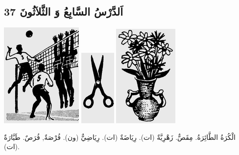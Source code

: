 \documentclass[a5paper]{article}
\begin{document}
\subsection[اَلدَّرْسُ السَّابِعُ وَ الثَّلاَثُونَ 37]{اَلدَّرْسُ السَّابِعُ وَ الثَّلاَثُونَ 37}
 \includegraphics[width=1.5937in,height=2.0417in]{MuhammadBagauddinlatinized-img087.png}   \includegraphics[width=0.698in,height=1.5in]{MuhammadBagauddinlatinized-img088.png}   \includegraphics[width=1.2602in,height=2.0102in]{MuhammadBagauddinlatinized-img089.png} 

الْكُرَةُ الطَّائِرَةُ. مِقَصٌّ. زَهْرِيَّةٌ (ات). رِيَاضَةٌ (ات). رِيَاضِيٌّ (ون). فُرْصَةٌ, فُرَصٌ. طَيَّارَةٌ (ات).
\end{document}
